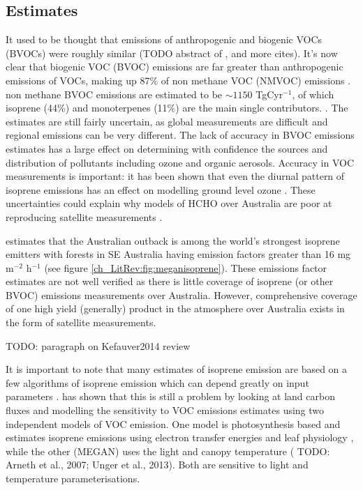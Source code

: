   \subsection{Estimates}
  \label{ch_LitRev:sec:BVOCestimates}
    It used to be thought that emissions of anthropogenic and biogenic VOCs (BVOCs) were roughly similar (TODO abstract of \citep{Mueller1992}, and more cites).
    It's now clear that biogenic VOC (BVOC) emissions are far greater than anthropogenic emissions of VOCs, making up 87\% of non methane VOC (NMVOC) emissions \citep{Kefauver2014}.
    non methane BVOC emissions are estimated to be $\sim1150$ TgCyr$^{-1}$, of which isoprene (44\%) and monoterpenes (11\%) are the main single contributors. \citep{Guenther2000, Kefauver2014}. 
    The estimates are still fairly uncertain, as global measurements are difficult and regional emissions can be very different. 
    The lack of accuracy in BVOC emissions estimates has a large effect on determining with confidence the sources and distribution of pollutants including ozone and organic aerosols.
    Accuracy in VOC measurements is important: it has been shown that even the diurnal pattern of isoprene emissions has an effect on modelling ground level ozone \citep{Hewitt2011,Fan2004}.
    These uncertainties could explain why models of HCHO over Australia are poor at reproducing satellite measurements \citep{Stavrakou2009}.

    \citet{Guenther2006} estimates that the Australian outback is among the world's strongest isoprene emitters with forests in SE Australia having emission factors greater than 16 mg m$^{-2}$ h$^{-1}$ (see figure \ref{ch_LitRev:fig:meganisoprene}).
    These emissions factor estimates are not well verified as there is little coverage of isoprene (or other BVOC) emissions measurements over Australia.
    However, comprehensive coverage of one high yield (generally) product in the atmosphere over Australia exists in the form of satellite measurements.
  
  TODO: paragraph on Kefauver2014 review  
    
    It is important to note that many estimates of isoprene emission are based on a few algorithms of isoprene emission which can depend greatly on input parameters \citep{Niinemets2010}.
    \citet{Yue2015} has shown that this is still a problem by looking at land carbon fluxes and modelling the sensitivity to VOC emissions estimates using two independent models of VOC emission.
    One model is photosynthesis based and estimates isoprene emissions using electron transfer energies and leaf physiology \citep{Niinemets1999}, while the other (MEGAN) uses the light and canopy temperature (\citep{Guenther1995} TODO: Arneth et al., 2007; Unger et al., 2013).
    Both are sensitive to light and temperature parameterisations.
    
